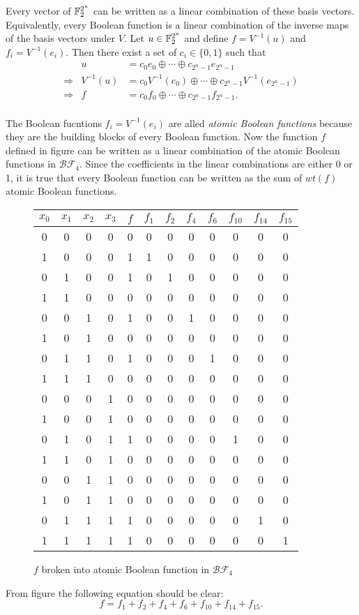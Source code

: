 \par Every vector of $\mathbb{F}_2^{2^n}$ can be written as a linear combination of these
basis vectors. Equivalently, every Boolean function is a linear combination of the
inverse maps of the basis vectors under $V$. Let $u\in\mathbb{F}_2^{2^n}$ and define
$f=V^{-1}(u)$ and $f_i=V^{-1}(e_i)$. Then there exist a set of $c_i\in\{0,1\}$ such that
\begin{align*}
						 &u        &=c_0e_0\oplus\cdots\oplus c_{2^n-1}e_{2^n-1} \\
	\Rightarrow&V^{-1}(u)&=c_0V^{-1}(e_0)\oplus\cdots\oplus c_{2^n-1}V^{-1}(e_{2^n-1}) \\
	\Rightarrow&f        &=c_0f_0\oplus\cdots\oplus c_{2^n-1}f_{2^n-1}.\\
\end{align*}

\par The Boolean fucntions $f_i=V^{-1}(e_i)$ are alled {\em atomic Boolean functions}
because they are the building blocks of every Boolean function. Now the function
$f$ defined in figure \cite{fig:truth-table} can be written as a linear combination
of the atomic Boolean functions in $\mathcal{BF}_4$. Since the coefficients in the
linear combinations are either 0 or 1, it is true that every Boolean function can be
written as the sum of $wt(f)$ atomic Boolean functions.
\begin{figure}[h!]\label{fig:atomic-f}
	\centering
  \begin{tabular}{|c|c|c|c|c|c|c|c|c|c|c|c|}
    \hline
    $x_0$&$x_1$&$x_2$&$x_3$&$f$&$f_1$&$f_2$&$f_4$&$f_6$&$f_{10}$&$f_{14}$&$f_{15}$\\
    \hline
    0&0&0&0&0&0&0&0&0&0&0&0\\
    1&0&0&0&1&1&0&0&0&0&0&0\\
    0&1&0&0&1&0&1&0&0&0&0&0\\
    1&1&0&0&0&0&0&0&0&0&0&0\\
    0&0&1&0&1&0&0&1&0&0&0&0\\
    1&0&1&0&0&0&0&0&0&0&0&0\\
    0&1&1&0&1&0&0&0&1&0&0&0\\
    1&1&1&0&0&0&0&0&0&0&0&0\\
    0&0&0&1&0&0&0&0&0&0&0&0\\
    1&0&0&1&0&0&0&0&0&0&0&0\\
    0&1&0&1&1&0&0&0&0&1&0&0\\
    1&1&0&1&0&0&0&0&0&0&0&0\\
    0&0&1&1&0&0&0&0&0&0&0&0\\
    1&0&1&1&0&0&0&0&0&0&0&0\\
    0&1&1&1&1&0&0&0&0&0&1&0\\
    1&1&1&1&1&0&0&0&0&0&0&1\\
  	\hline
	\end{tabular}
	\caption{$f$ broken into atomic Boolean function in $\mathcal{BF}_4$}
\end{figure}
\par From figure \cite{fig:atomic-f} the following equation should be clear:
\[
f=f_1+f_2+f_4+f_6+f_{10}+f_{14}+f_{15}.
\]

